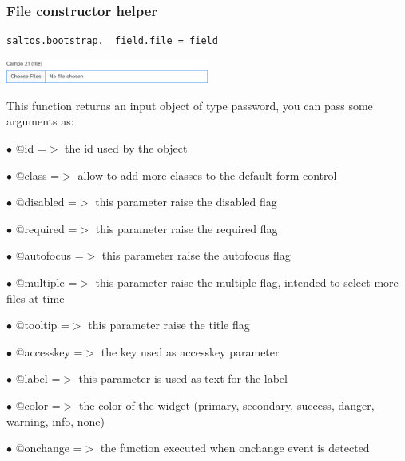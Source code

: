 \documentclass[a4paper]{article}
\begin{document}
\hypertarget{toc69}{}
\subsubsection{File constructor helper}

\begin{lstlisting}
saltos.bootstrap.__field.file = field
\end{lstlisting}

\begin{center}\includegraphics[width=0.5\textwidth]{../ujest/snaps/test-bootstrap-js-bootstrap-campo-21-file-1-snap.png}\end{center}

This function returns an input object of type password, you can pass some arguments as:

\begin{compactitem}
\item[\color{myblue}$\bullet$] @id        =$>$ the id used by the object
\item[\color{myblue}$\bullet$] @class     =$>$ allow to add more classes to the default form-control
\item[\color{myblue}$\bullet$] @disabled  =$>$ this parameter raise the disabled flag
\item[\color{myblue}$\bullet$] @required  =$>$ this parameter raise the required flag
\item[\color{myblue}$\bullet$] @autofocus =$>$ this parameter raise the autofocus flag
\item[\color{myblue}$\bullet$] @multiple  =$>$ this parameter raise the multiple flag, intended to select more files at time
\item[\color{myblue}$\bullet$] @tooltip   =$>$ this parameter raise the title flag
\item[\color{myblue}$\bullet$] @accesskey =$>$ the key used as accesskey parameter
\item[\color{myblue}$\bullet$] @label     =$>$ this parameter is used as text for the label
\item[\color{myblue}$\bullet$] @color     =$>$ the color of the widget (primary, secondary, success, danger, warning, info, none)
\item[\color{myblue}$\bullet$] @onchange  =$>$ the function executed when onchange event is detected
\end{compactitem}
\end{document}
